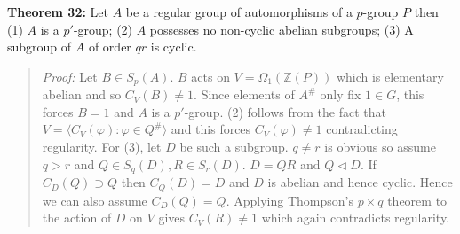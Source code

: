 {\bf Theorem 32:}
Let $A$ be a regular group of automorphisms of a $p$-group $P$ then
(1) $A$ is a $p'$-group;
(2) $A$ possesses no non-cyclic abelian subgroups;
(3) A subgroup of $A$ of order $qr$ is cyclic.
\begin{quote}
\emph{Proof:}  
Let $B \in S_p(A)$.  $B$ acts on $V= \Omega_1({\mathbb Z}(P))$ which is elementary abelian
and so $C_V(B) \ne 1$.  Since elements of $A^{\#}$ only fix $1 \in G$, this forces
$B= 1$ and $A$ is a $p'$-group. (2) follows from the fact that 
$V= \langle C_V( \varphi): \varphi \in Q^{\#} \rangle$ and this forces $C_V(\varphi) \ne 1$
contradicting regularity.  For (3), let $D$ be such a subgroup. $q \ne r$ is obvious so
assume $q > r$ and $Q \in S_q(D), R \in S_r(D)$.  $D= QR$ and $Q \lhd D$.  If
$C_D(Q) \supset Q$ then $C_Q(D)= D$ and $D$ is abelian and hence cyclic.  Hence we
can also assume $C_D(Q)= Q$.  Applying Thompson's $p \times q$ theorem to the
action of $D$ on $V$ gives $C_V(R) \ne 1$ which again contradicts regularity.
\end{quote}
